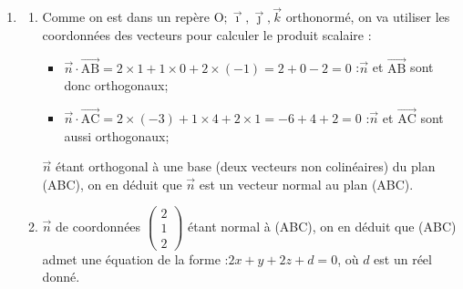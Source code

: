 \documentclass[10pt]{article}
\providecommand{\vect}[1]{\overrightarrow{#1}}
\providecommand{\Oijk}{\(\mathrm{O};\vec{\imath},\vec{\jmath},\vec{k}\)}
\begin{document}
\begin{enumerate}
\begin{enumerate}
		On remarque que l'on a :\quad $\vect{\mathrm{CD}} = 4\times \vect{\mathrm{AB}} + 0\times \vect{\mathrm{AC}}$.

		Le vecteur $\vect{\mathrm{CD}}$ peut donc être écrit comme combinaison linéaire des vecteurs $\vect{\mathrm{AB}}$ et $\vect{\mathrm{AC}}$, donc c'est un vecteur du plan (ABC), et puisque C est dans le plan (ABC), on en déduit que D est également dans (ABC).

		Finalement, puisque D est dans (ABC), les quatre points A, B, C et D sont bien coplanaires.

		\item À la question précédente, on a établi $\vect{\mathrm{CD}} = 4\times \vect{\mathrm{AB}} + 0\times \vect{\mathrm{AC}}$, c'est-à-dire $\vect{\mathrm{CD}} = 4\times \vect{\mathrm{AB}}$. Les vecteurs $\vect{\mathrm{AB}}$ et $\vect{\mathrm{CD}}$ étant colinéaires, les segments [AB] et [CD] sont portés par des droites parallèles (strictement, car C n'est pas aligné avec A et B).

		ABCD est donc une figure plane (les quatre points étant coplanaires), c'est donc un quadrilatère, non croisé (puisque $\vect{\mathrm{AB}}$ et $\vect{\mathrm{CD}}$ sont colinéaires de même sens, cela signifie que ABDC est non croisé, ABCD serait un quadrilatère croisé), dont les côtés [AB] et [DC] sont parallèles : le quadrilatère ABDC est donc bien un trapèze, de bases [AB] et [DC].
	\end{enumerate}

\item \begin{enumerate}
	\item Comme on est dans un repère \Oijk{} orthonormé, on va utiliser les coordonnées des vecteurs pour calculer le produit scalaire :
	\begin{itemize}
		\item $\vect{n}\cdot\vect{\mathrm{AB}} = 2\times 1 + 1 \times 0 + 2 \times (-1) = 2 + 0 - 2 = 0$ :\quad $ \vect{n}$ et $\vect{\mathrm{AB}}$ sont donc orthogonaux;
		\item $\vect{n}\cdot\vect{\mathrm{AC}} = 2\times (-3) + 1 \times 4 + 2 \times 1 = -6 + 4 + 2 = 0$ :\quad $ \vect{n}$ et $\vect{\mathrm{AC}}$ sont aussi orthogonaux;
	\end{itemize}

	$\vect{n}$ étant orthogonal à une base (deux vecteurs non colinéaires) du plan (ABC), on en déduit que $\vect{n}$ est un vecteur normal au plan (ABC).

	\item $\vect{n}$ de coordonnées $\begin{pmatrix}2\\1\\2\end{pmatrix}$ étant normal à (ABC), on en déduit que (ABC) admet une équation de la forme :\quad$ 2x + y + 2z + d = 0$, où $d$ est un réel donné.


\end{enumerate}
\end{enumerate}
\end{document}
